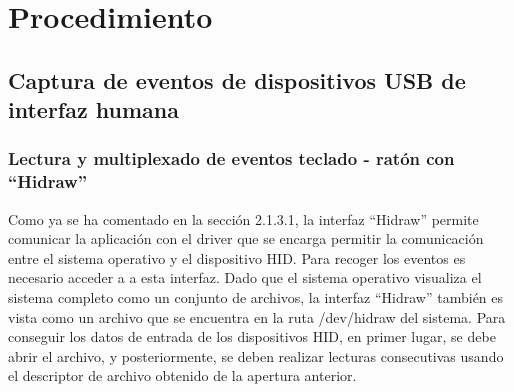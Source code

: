 \chapter{Procedimiento} \label{cap3}



\newpage


\section{Captura de eventos de dispositivos USB de interfaz humana} \label{s3_1}

\subsection{Lectura y multiplexado de eventos teclado - ratón con ``Hidraw''} \label{s3_1_1}

Como ya se ha comentado en la sección 2.1.3.1, la interfaz ``Hidraw'' permite comunicar la aplicación con el driver que se encarga permitir la comunicación entre el sistema operativo y el dispositivo HID. Para recoger los eventos es necesario acceder a a esta interfaz. Dado que el sistema operativo visualiza el sistema completo como un conjunto de archivos, la interfaz ``Hidraw'' también es vista como un archivo que se encuentra en la ruta /dev/hidraw del sistema. Para conseguir los datos de entrada de los dispositivos HID, en primer lugar, se debe abrir el archivo, y posteriormente, se deben realizar lecturas consecutivas usando el descriptor de archivo obtenido de la apertura anterior. 

